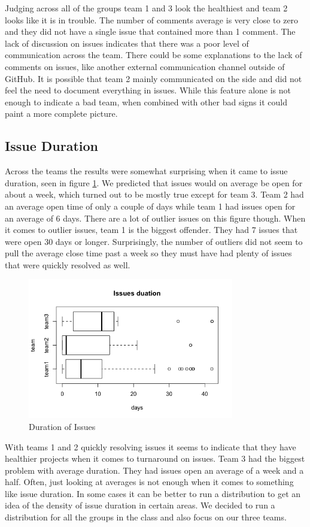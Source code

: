 \documentclass[conference]{IEEEtran}
\begin{document}
Judging across all of the groups team 1 and 3 look the healthiest and team 2 looks like it is in trouble. The number of comments average is very close to zero and they did not have a single issue that contained more than 1 comment. The lack of discussion on issues indicates that there was a poor level of communication across the team. There could be some explanations to the lack of comments on issues, like another external communication channel outside of GitHub. It is possible that team 2 mainly communicated on the side and did not feel the need to document everything in issues. While this feature alone is not enough to indicate a bad team, when combined with other bad signs it could paint a more complete picture. 

\subsection{Issue Duration}
Across the teams the results were somewhat surprising when it came to issue duration, seen in figure \ref{issue_duration}. We predicted that issues would on average be open for about a week, which turned out to be mostly true except for team 3. Team 2 had an average open time of only a couple of days while team 1 had issues open for an average of 6 days. There are a lot of outlier issues on this figure though. When it comes to outlier issues, team 1 is the biggest offender. They had 7 issues that were open 30 days or longer. Surprisingly, the number of outliers did not seem to pull the average close time past a week so they must have had plenty of issues that were quickly resolved as well. 

\begin{figure}[H]
    \centering
    \includegraphics[width=9cm]{../AprilProject/pic/issues_duration.png}
    \caption{Duration of Issues}
    \label{issue_duration}
\end{figure}

With teams 1 and 2 quickly resolving issues it seems to indicate that they have healthier projects when it comes to turnaround on issues. Team 3 had the biggest problem with average duration. They had issues open an average of a week and a half. Often, just looking at averages is not enough when it comes to something like issue duration. In some cases it can be better to run a distribution to get an idea of the density of issue duration in certain areas. We decided to run a distribution for all the groups in the class and also focus on our three teams. 
\end{document}
